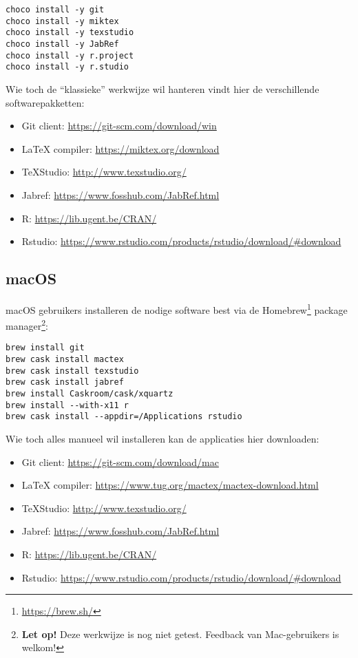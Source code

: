 \begin{verbatim}
choco install -y git
choco install -y miktex
choco install -y texstudio
choco install -y JabRef
choco install -y r.project
choco install -y r.studio
\end{verbatim}

Wie toch de ``klassieke'' werkwijze wil hanteren vindt hier de verschillende softwarepakketten:

\begin{itemize}
  \item Git client: \url{https://git-scm.com/download/win}
  \item \LaTeX{} compiler: \url{https://miktex.org/download}
  \item TeXStudio: \url{http://www.texstudio.org/}
  \item Jabref: \url{https://www.fosshub.com/JabRef.html}
  \item R: \url{https://lib.ugent.be/CRAN/}
  \item Rstudio: \url{https://www.rstudio.com/products/rstudio/download/#download}
\end{itemize}

\subsection{macOS}

macOS gebruikers installeren de nodige software best via de Homebrew\footnote{\url{https://brew.sh/}} package manager\footnote{\textbf{Let op!} Deze werkwijze is nog niet getest. Feedback van Mac-gebruikers is welkom!}:

\begin{verbatim}
brew install git
brew cask install mactex
brew cask install texstudio
brew cask install jabref
brew install Caskroom/cask/xquartz
brew install --with-x11 r
brew cask install --appdir=/Applications rstudio
\end{verbatim}

Wie toch alles manueel wil installeren kan de applicaties hier downloaden:

\begin{itemize}
  \item Git client: \url{https://git-scm.com/download/mac}
  \item \LaTeX{} compiler: \url{https://www.tug.org/mactex/mactex-download.html}
  \item TeXStudio: \url{http://www.texstudio.org/}
  \item Jabref: \url{https://www.fosshub.com/JabRef.html}
  \item R: \url{https://lib.ugent.be/CRAN/}
  \item Rstudio: \url{https://www.rstudio.com/products/rstudio/download/#download}
\end{itemize}


